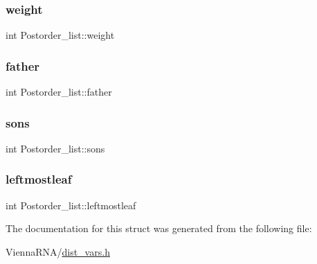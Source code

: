 \subsubsection{\texorpdfstring{weight}{weight}}
{\footnotesize\ttfamily int Postorder\+\_\+list\+::weight}

\mbox{\label{struct_postorder__list_ab41ab9f9394007a89d316e75b76acfab}} 
\subsubsection{\texorpdfstring{father}{father}}
{\footnotesize\ttfamily int Postorder\+\_\+list\+::father}

\mbox{\label{struct_postorder__list_a058d36bce140d937db829fcd2067af9f}} 
\subsubsection{\texorpdfstring{sons}{sons}}
{\footnotesize\ttfamily int Postorder\+\_\+list\+::sons}

\mbox{\label{struct_postorder__list_a23626266a53e5d2860905d1f16658afc}} 
\subsubsection{\texorpdfstring{leftmostleaf}{leftmostleaf}}
{\footnotesize\ttfamily int Postorder\+\_\+list\+::leftmostleaf}



The documentation for this struct was generated from the following file\+:\begin{DoxyCompactItemize}
\item 
Vienna\+R\+N\+A/\mbox{\hyperlink{dist__vars_8h}{dist\+\_\+vars.\+h}}\end{DoxyCompactItemize}
